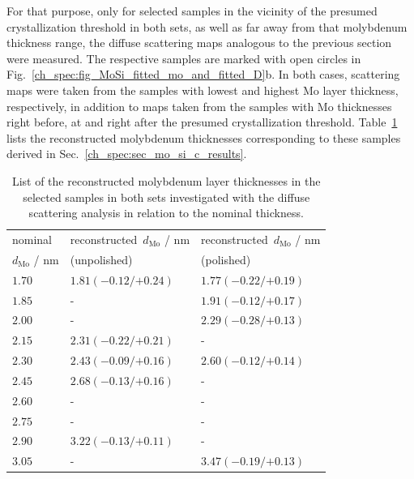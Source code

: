 For that purpose, only for selected samples in the vicinity of the presumed crystallization threshold in both sets, as well as far away from that molybdenum thickness range, the diffuse scattering maps analogous to the previous section were measured. The respective samples are marked with open circles in Fig.~\ref{ch_spec:fig_MoSi_fitted_mo_and_fitted_D}b. In both cases, scattering maps were taken from the samples with lowest and highest Mo layer thickness, respectively, in addition to maps taken from the samples with Mo thicknesses right before, at and right after the presumed crystallization threshold. Table~\ref{ch_diff:tbl_mo_si_thickness_mcmc_result_selected_samples} lists the reconstructed molybdenum thicknesses corresponding to these samples derived in Sec.~\ref{ch_spec:sec_mo_si_c_results}.
\begin{table}[htbp]
\centering
\caption{List of the reconstructed molybdenum layer thicknesses in the selected samples in both sets investigated with the diffuse scattering analysis in relation to the nominal thickness.}
\label{ch_diff:tbl_mo_si_thickness_mcmc_result_selected_samples}
\begin{tabular}{@{}lll@{}}
\toprule
nominal &reconstructed~$d_\text{Mo}$ / nm&reconstructed~$d_\text{Mo}$ / nm\\ 
$d_\text{Mo}$ / nm&(unpolished) & (polished) \\
\midrule
$1.70$ &$1.81({-0.12}/{+0.24})$  &$1.77({-0.22}/{+0.19})$ \\
$1.85$ &-  &$1.91({-0.12}/{+0.17})$ \\
$2.00$ &-  &$2.29({-0.28}/{+0.13})$ \\
$2.15$ &$2.31({-0.22}/{+0.21})$  &- \\
$2.30$ &$2.43({-0.09}/{+0.16})$   &$2.60({-0.12}/{+0.14})$ \\
$2.45$ &$2.68({-0.13}/{+0.16})$  &- \\
$2.60$ &- &- \\
$2.75$ &-  &- \\
$2.90$ &$3.22({-0.13}/{+0.11})$ &- \\
$3.05$ &-  & $3.47({-0.19}/{+0.13})$ \\
 \bottomrule
\end{tabular}
\end{table}

